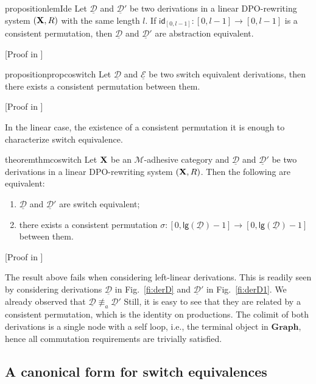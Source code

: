 \documentclass[a4paper,UKenglish,cleveref,pdftex, thm-restate,numberwithinsect,anonymous]{lipics}
\newcommand{\cat}[1]{\ensuremath{\mathbf{#1}}}
\newcommand{\id}[1]{\mathsf{id}_{#1}}
\def\R{\mathsf{R}}
\def\X{\textbf {\textup{X}}}
\newcommand{\dder}[1]{\mathscr{#1}}
\newcommand{\der}[1]{\underline{\dder{#1}}}
\newcommand{\lgh}[0]{\mathsf{lg}}
\begin{document}
\begin{restatable}{proposition}{lemIde}\label{lem:ide}
	Let $\der{D}$ and $\der{D}'$ be two derivations in a linear DPO-rewriting system $(\X, \R)$ with the same length $l$. If $\id{[0,l-1]}:[0,l-1]\to [0,l-1]$ is a consistent permutation, then $\der{D}$ and $\der{D}'$ are abstraction equivalent.  
\end{restatable}
[Proof in ]


\begin{restatable}{proposition}{propcoswitch}\label{prop:coswitch}
Let $\der{D}$ and $\der{E}$ be two switch equivalent derivations, then there exists a consistent permutation between them.
\end{restatable}	
[Proof in ]

In the linear case, the existence of a consistent permutation it is enough to characterize switch equivalence. 


\begin{restatable}{theorem}{thmcoswitch}
Let $\X$ be an $\mathcal{M}$-adhesive category and 
$\der{D}$ and $\der{D}'$ be two derivations in a linear DPO-rewriting system $(\X, \R)$. 
Then the following are equivalent:
\begin{enumerate}
	\item $\der{D}$ and $\der{D}'$ are switch equivalent;
	\item there exists a consistent permutation $\sigma\colon [0,\lgh(\der{D})-1]\to [0,\lgh(\der{D})-1]$ between them.
\end{enumerate}
\end{restatable}
[Proof in ]


\begin{example}
  The result above fails when considering left-linear
  derivations. This is readily seen by considering derivations
  $\der{D}$ in Fig.~\ref{fi:derD} and $\der{D}'$ in
  Fig.~\ref{fi:derD1}. We already observed that
  $\der{D} \not\equiv_a \der{D}'$
  Still, it is easy to see that they are related by a consistent
  permutation, which is the identity on productions. The colimit of
  both derivations is a single node with a self loop, i.e., the
  terminal object in $\cat{Graph}$, hence all commutation requirements
  are trivially satisfied.
\end{example}


\subsection{A canonical form for  switch equivalences}
\label{subsec:canonical}
\end{document}

